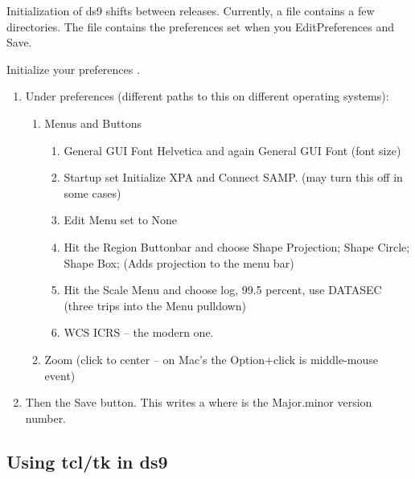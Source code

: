 Initialization of ds9 shifts between releases. Currently, a file
 contains a few directories. The 
file contains the preferences set when you Edit\menu Preferences
and Save. 

Initialize your preferences .

\vspace{-.15cm}
\begin{enumerate}\addtolength{\itemsep}{-0.5\baselineskip}
   \item   Under preferences (different paths to this on different operating
systems):
\vspace{-.15cm}
\begin{enumerate}\addtolength{\itemsep}{-0.5\baselineskip}
   \item   Menus and Buttons
\vspace{-.15cm}
\begin{enumerate}\addtolength{\itemsep}{-0.5\baselineskip}
   \item   General \menu GUI Font \menu Helvetica and again General \menu GUI Font 
(font size) 
   \item   Startup set Initialize XPA and Connect SAMP. (may turn this off in some cases)
   \item   Edit \menu Menu set to None
   \item   Hit the Region \menu Buttonbar and choose Shape \menu Projection; 
Shape \menu Circle; Shape \menu Box; (Adds projection to the menu bar)
   \item   Hit the Scale Menu \menu and choose log, 99.5 percent, use DATASEC
(three trips into the Menu pulldown)
   \item   WCS \menu ICRS -- the modern one.
\end{enumerate}

   \item   Zoom (click to center -- on Mac's the Option+click is middle-mouse event)
\end{enumerate}

   \item   Then the Save button. This writes a {\color{verbcolor}{\verb#~/.ds9/ds9.M.m.prf#}}
where {\color{verbcolor}{\verb#M.m#}} is the Major.minor version number.
\end{enumerate}

\subsection{Using tcl/tk in ds9}

